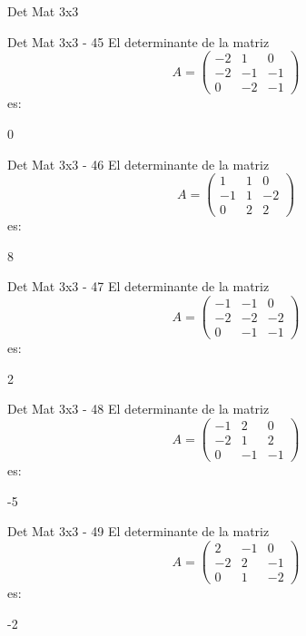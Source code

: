 \documentclass[a4,11pt]{aleph-notas}
\begin{document}
\begin{quiz}{Det Mat 3x3}
\begin{numerical}[tolerance=0]%
    {Det Mat 3x3 - 45}
    El determinante de la matriz
    \[
        A = \begin{pmatrix} -2 & 1 & 0 \\ -2 & -1 & -1 \\ 0 & -2 & -1 \end{pmatrix}
    \]
    es:
    \item[] 0
\end{numerical}

\begin{numerical}[tolerance=0]%
    {Det Mat 3x3 - 46}
    El determinante de la matriz
    \[
        A = \begin{pmatrix} 1 & 1 & 0 \\ -1 & 1 & -2 \\ 0 & 2 & 2 \end{pmatrix}
    \]
    es:
    \item[] 8
\end{numerical}

\begin{numerical}[tolerance=0]%
    {Det Mat 3x3 - 47}
    El determinante de la matriz
    \[
        A = \begin{pmatrix} -1 & -1 & 0 \\ -2 & -2 & -2 \\ 0 & -1 & -1 \end{pmatrix}
    \]
    es:
    \item[] 2
\end{numerical}

\begin{numerical}[tolerance=0]%
    {Det Mat 3x3 - 48}
    El determinante de la matriz
    \[
        A = \begin{pmatrix} -1 & 2 & 0 \\ -2 & 1 & 2 \\ 0 & -1 & -1 \end{pmatrix}
    \]
    es:
    \item[] -5
\end{numerical}

\begin{numerical}[tolerance=0]%
    {Det Mat 3x3 - 49}
    El determinante de la matriz
    \[
        A = \begin{pmatrix} 2 & -1 & 0 \\ -2 & 2 & -1 \\ 0 & 1 & -2 \end{pmatrix}
    \]
    es:
    \item[] -2
\end{numerical}


\end{quiz}
\end{document}
